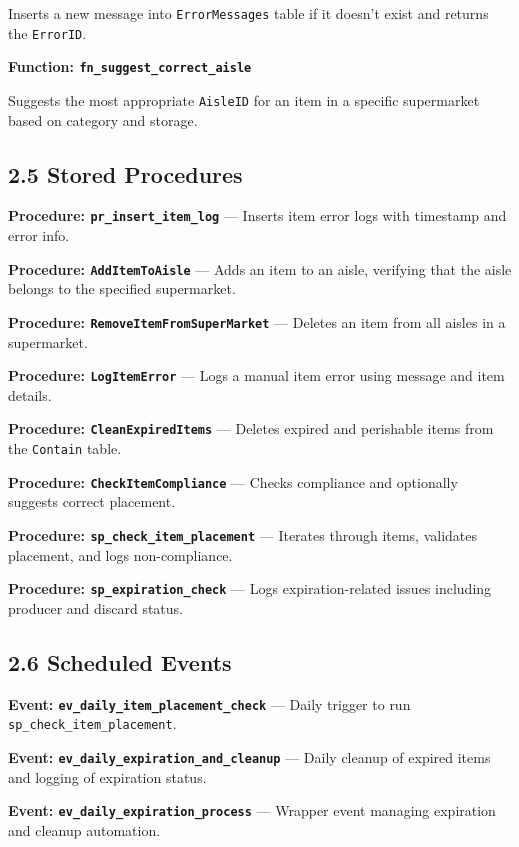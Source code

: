 \documentclass[a4paper,12pt]{article}
\begin{document}
Inserts a new message into \texttt{ErrorMessages} table if it doesn’t exist and returns the \texttt{ErrorID}.

\textbf{Function: \texttt{fn\_suggest\_correct\_aisle}}

Suggests the most appropriate \texttt{AisleID} for an item in a specific supermarket based on category and storage.

\subsection*{2.5 Stored Procedures}

\textbf{Procedure: \texttt{pr\_insert\_item\_log}} — Inserts item error logs with timestamp and error info.

\textbf{Procedure: \texttt{AddItemToAisle}} — Adds an item to an aisle, verifying that the aisle belongs to the specified supermarket.

\textbf{Procedure: \texttt{RemoveItemFromSuperMarket}} — Deletes an item from all aisles in a supermarket.

\textbf{Procedure: \texttt{LogItemError}} — Logs a manual item error using message and item details.

\textbf{Procedure: \texttt{CleanExpiredItems}} — Deletes expired and perishable items from the \texttt{Contain} table.

\textbf{Procedure: \texttt{CheckItemCompliance}} — Checks compliance and optionally suggests correct placement.

\textbf{Procedure: \texttt{sp\_check\_item\_placement}} — Iterates through items, validates placement, and logs non-compliance.

\textbf{Procedure: \texttt{sp\_expiration\_check}} — Logs expiration-related issues including producer and discard status.

\subsection*{2.6 Scheduled Events}

\textbf{Event: \texttt{ev\_daily\_item\_placement\_check}} — Daily trigger to run \texttt{sp\_check\_item\_placement}.

\textbf{Event: \texttt{ev\_daily\_expiration\_and\_cleanup}} — Daily cleanup of expired items and logging of expiration status.

\textbf{Event: \texttt{ev\_daily\_expiration\_process}} — Wrapper event managing expiration and cleanup automation.
\end{document}

